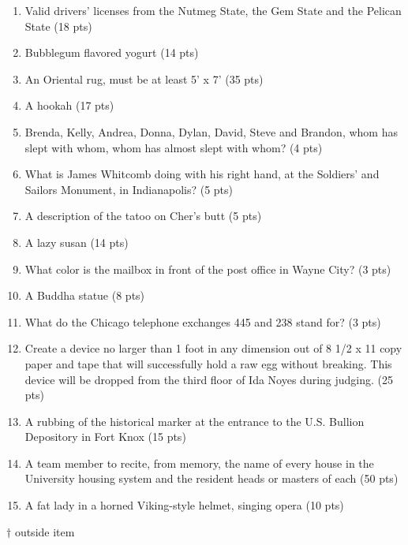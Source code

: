 \begin{enumerate}
\item Valid drivers' licenses from the Nutmeg State, the Gem State and the Pelican State (18 pts)
\item Bubblegum flavored yogurt (14 pts)
\item An Oriental rug, must be at least 5' x 7' (35 pts)
\item A hookah (17 pts)
\item Brenda, Kelly, Andrea, Donna, Dylan, David, Steve and Brandon, whom has slept with whom, whom has almost slept with whom? (4 pts)
\item What is James Whitcomb doing with his right hand, at the Soldiers' and Sailors Monument, in Indianapolis? (5 pts)
\item A description of the tatoo on Cher's butt (5 pts)
\item A lazy susan (14 pts)
\item What color is the mailbox in front of the post office in Wayne City? (3 pts)
\item A Buddha statue (8 pts)
\item What do the Chicago telephone exchanges 445 and 238 stand for? (3 pts)
\item Create a device no larger than 1 foot in any dimension out of 8 1/2 x 11 copy paper and tape that will successfully hold a raw egg without breaking. This device will be dropped from the third floor of Ida Noyes during judging. (25 pts)
\item A rubbing of the historical marker at the entrance to the U.S. Bullion Depository in Fort Knox (15 pts)
\item A team member to recite, from memory, the name of every house in the University housing system and the resident heads or masters of each (50 pts)
\item A fat lady in a horned Viking-style helmet, singing opera (10 pts)
\end{enumerate}

$\dagger$ outside item
